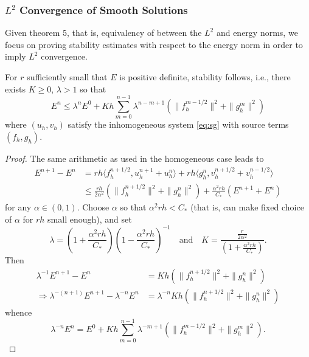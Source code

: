\subsubsection{$L^2$ Convergence of Smooth Solutions}


Given theorem 5, that is, equivalency of between the $L^2$ and energy norms, we focus on proving stability estimates with respect to the energy norm in order to imply $L^2$ convergence. 

\begin{theorem}
For $r$ sufficiently small that $E$ is positive definite, stability follows, i.e., there exists $K \ge 0$, $\lambda > 1$ so that
\[
	E^n \le \lambda^n E^0 + 
	Kh\sum_{m=0}^{n-1}\lambda^{n-m+1}(\|f^{m-1/2}_h\|^2 + \|g^m_h\|^2)
\]
where $(u_h,v_h)$ satisfy the inhomogeneous system \ref{eq:sg} with source terms $(f_h,g_h)$.
\end{theorem}

\begin{proof}
The same arithmetic as used in the homogeneous case leads to
\begin{equation*}
\begin{split}
	E^{n+1}-E^n 
	&= rh\langle f^{n+1/2}_h, u^{n+1}_h+u^n_h\rangle + rh\langle g^n_h,
v^{n+1/2}_h+v^{n-1/2}_h\rangle\\
	&\le \frac{rh}{2\alpha^2} (\|f^{n+1/2}_h\|^2 + \|g^n_h\|^2) +
\frac{\alpha^2rh}{C_*}(E^{n+1}+E^n)
\end{split}
\end{equation*}
for any $\alpha \in (0,1)$. Choose $\alpha$ so that $\alpha^2 rh < C_*$
(that is, can make fixed choice of $\alpha$ for $rh$ small enough), and
set 
\begin{equation}\label{eq:K}
	\lambda = \left(1+\frac{\alpha^2rh}{C_*}\right) \left(1-\frac{\alpha^2rh}{C_*}\right)^{-1}
	\quad
	\text{and}
	\quad
	K = \frac{\frac{r}{2\alpha^2}}{ \left(1+\frac{\alpha^2rh}{C_*}\right) }.
\end{equation}
Then
\begin{equation*}
\begin{split}
	\lambda^{-1}E^{n+1} - E^n &= Kh (\|f^{n+1/2}_h\|^2 + \|g^n_h\|^2)  \\
	\Longrightarrow
	\lambda^{-(n+1)}E^{n+1} - \lambda^{-n}E^n &= \lambda^{-n}Kh (\|f^{n+1/2}_h\|^2 + \|g^n_h\|^2) 
\end{split}
\end{equation*}
whence
\[
\lambda^{-n}E^n = E^0 +
Kh\sum_{m=0}^{n-1}\lambda^{-m+1}(\|f^{m-1/2}_h\|^2 + \|g^m_h\|^2).
\]
\end{proof}

